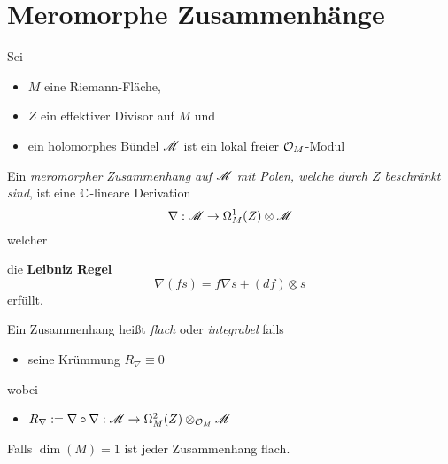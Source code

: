 \section{Meromorphe Zusammenhänge} %
Sei
\begin{itemize}
  \item $M$ eine Riemann-Fläche\marginnote{$\C$},
  \item $Z$ ein effektiver Divisor auf $M$ und
  \item ein holomorphes Bündel $\mathscr{M}$ ist ein lokal freier $\mathcal{O}_M$-Modul
\end{itemize}
\begin{defn}
  Ein \emph{meromorpher Zusammenhang auf $\mathscr{M}$ mit Polen, welche durch $Z$
  beschränkt sind}, ist eine $\C$-lineare Derivation
  \[
    \nabla:\mathscr{M}\to\Omega_M^1(Z)\otimes\mathscr{M}
  \]
  welcher
  \begin{comment}
    \begin{itemize}
      \item für
        \begin{itemize}
          \item alle offenen Mengen $U\subset M$,
          \item alle Schnitte $s\in\Gamma(U,\sM)$ und
          \item alle holomorphen Funktionen $f\in\cO(U)$
        \end{itemize}
    \end{itemize}
  \end{comment}
  die \textbf{Leibniz Regel}
  \[
    \nabla(fs)=f\nabla s+(df)\otimes s
  \]
  erfüllt.

  \begin{defn}
    Ein Zusammenhang heißt \emph{flach} oder \emph{integrabel} falls
    \begin{itemize}
      \item seine Krümmung $R_\nabla\equiv0$
    \end{itemize}
    wobei
    \begin{itemize}
      \item $R_\nabla
        :=\nabla\circ\nabla:\mathscr{M}\to\Omega_M^2(Z)\otimes_{\mathcal{O}_M}\mathscr{M}$
    \end{itemize}
    \begin{rem}
      Falls $\dim(M)=1$ ist jeder Zusammenhang flach.
    \end{rem}
  \end{defn}
\end{defn}
